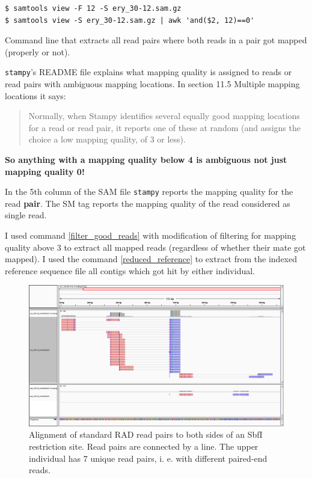 \documentclass{article}\usepackage[]{graphicx}\usepackage[]{color}
\begin{document}
\begin{command}
\captionsetup{type=command} %
\begin{Verbatim}
$ samtools view -F 12 -S ery_30-12.sam.gz
$ samtools view -S ery_30-12.sam.gz | awk 'and($2, 12)==0'
\end{Verbatim}
\caption{Command line that extracts all read pairs where both reads in a pair got mapped (properly or not).}
\label{filter_unmapped_read_pairs}
\end{command}

\texttt{stampy}'s README file explains what mapping quality is assigned to reads or read pairs with ambiguous mapping locations. In section \textrm{11.5 Multiple mapping locations} it says:
\begin{quote}
\textsf{
Normally, when Stampy identifies several equally good mapping locations for a read or read pair, it reports one of these at random (and assigns the choice a low mapping quality, of 3 or less).
}
\end{quote}
\textbf{So anything with a mapping quality below 4 is ambiguous not just mapping quality 0!}

In the 5th column of the SAM file \texttt{stampy} reports the mapping quality for the read \textbf{pair}. The SM tag reports the mapping quality of the read considered as single read.

I used command \ref{filter_good_reads} with modification of filtering for mapping quality above 3 to extract all mapped reads (regardless of whether their mate got mapped).
I used the command \ref{reduced_reference} to extract from the indexed reference sequence file all contigs which got hit by either individual.

\begin{figure}
\centering
\includegraphics[width=\textwidth]{./figure/igv_LC_1628_C1_Contig1776_standRAD}
\caption{Alignment of standard RAD read pairs to both sides of an SbfI restriction site. Read pairs are connected by a line. The upper individual has 7 unique read pairs, i. e. with different paired-end reads.}
\label{LC.1628.C1.Contig1776_standRAD}
\end{figure}
\end{document}
